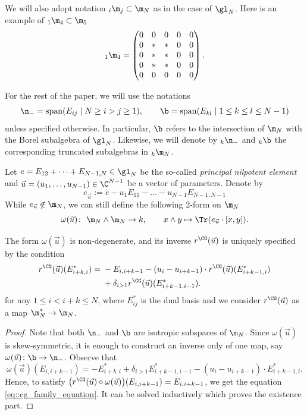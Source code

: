 	We will also adopt notation ${}_i \m_j \subset \m_N$ as in the case of $\gl_N$. Here is an example of ${}_1 \m_4 \subset \m_5$
	\[
	{}_1 \m_4 = \begin{pmatrix}
		0 & 0 & 0 & 0 & 0 \\
		0 & * & * & 0 & 0 \\
		0 & * & * & 0 & 0 \\
		0 & * & * & 0 & 0 \\
		0& 0 & 0 & 0 & 0
	\end{pmatrix}.
	\]
	
	For the rest of the paper, we will use the notations
	\[
			\n_- = \mathrm{span}(E_{ij} \mid N \geq i > j \geq 1), \qquad
			\b = \mathrm{span}(E_{kl} \mid 1 \leq k \leq l \leq N-1)
	\]
	unless specified otherwise. In particular, $\b$ refers to the intersection of $\m_N$ with the Borel subalgebra of $\gl_N$. Likewise, we will denote by ${}_k\n_-$ and ${}_k \b$ the corresponding truncated subalgebras in ${}_k \m_N$.
	
	Let $e = E_{12} + \dots + E_{N-1,N} \in \gl_N$ be the so-called \emph{principal nilpotent element} and $\vec{u}=(u_1,\dots,u_{N-1})\in \C^{N-1}$ be a vector of parameters. Denote by
	\begin{equation}
		\label{eq::principal_nilpotent}
		e_{\vec{u}} := e - u_1 E_{11} - \dots - u_{N-1} E_{N-1,N-1}
	\end{equation}
	While $e_{\vec{u}} \not\in \m_N$, we can still define the following 2-form on $\m_N$
	\[%
		\omega(\vec{u})\colon\ \m_N \wedge \m_N \rightarrow k, \qquad x\wedge y \mapsto \Tr(e_{\vec{u}}\cdot [x,y]).
	\]
	
	\begin{Proposition}
		\label{prop::cg_family_equation}
		The form $\omega(\vec{u})$ is non-degenerate, and its inverse $r^{\CG}(\vec{u})$ is uniquely specified by the condition
		\begin{align}
			r^{\CG}(\vec{u})(E_{i+k,i}^*) ={}& -E_{i,i+k-1} - (u_i - u_{i+k-1}) \cdot r^{\CG}(\vec{u})(E_{i+k-1,i}^*)\nonumber\\
&+ \delta_{i>1} r^{\CG}(\vec{u})(E_{i+k-1,i-1}^*).\label{eq::cg_family_equation}
		\end{align}
		for any $1 \leq i < i+k \leq N$, where $E_{ij}^*$ is the dual basis and we consider $r^{\CG}(\vec{u})$ as a map $ \m_N^* \rightarrow \m_N$.
		\begin{proof}
			Note that both $\n_-$ and $\b$ are isotropic subspaces of $\m_N$. Since $\omega(\vec{u})$ is skew-symmetric, it is enough to construct an inverse only of one map, say $\omega(\vec{u})\colon \b \rightarrow \n_-$. Observe that
			\[
			\omega(\vec{u})(E_{i,i+k-1}) = -E_{i+k,i}^* + \delta_{i>1} E_{i+k-1,i-1}^* - (u_i - u_{i+k-1}) \cdot E_{i+k-1,i}^*.
			\]
			Hence, to satisfy $\bigl(r^{\CG}(\vec{u}) \circ \omega(\vec{u}) \bigr) (E_{i,i+k-1}) = E_{i,i+k-1}$, we get the equation \eqref{eq::cg_family_equation}. It can be solved inductively which proves the existence part.
		\end{proof}
	\end{Proposition}
	
